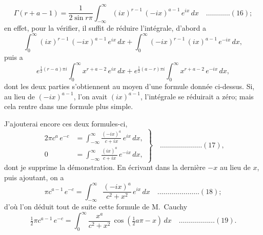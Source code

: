 \documentclass[11pt,a4paper]{book}
\begin{document}
\[
\Gamma(r + a - 1) = \frac{1}{2\sin r\pi} \int_{-\infty}^{\infty} (ix)^{r-1}\, (-ix)^{a-1}\, e^{ix}\, dx \quad \ldots \ldots \ldots \ldots (16);
\]
en effet, pour la v\'erifier, il suffit de r\'eduire l'int\'egrale, d'abord a
\[
\int_0^{\infty} (ix)^{r-1}\, (-ix)^{a-1}\, e^{ix}\, dx + \int_0^{\infty} (-ix)^{r-1}\, (ix)^{a-1}\, e^{-ix}\, dx,
\]
puis a
\[
e^{\frac{1}{2}(r-a)\pi i} \int_0^{\infty} x^{r+a-2}\, e^{ix}\, dx + e^{\frac{1}{2}(a-r)\pi i} \int_0^{\infty} x^{r+a-2}\, e^{-ix}\, dx,
\]
dont les deux parties s'obtiennent au moyen d'une formule donn\'ee ci-dessus. Si, au lieu de $(-ix)^{a-1}$, l'on avait $(ix)^{a-1}$, l'int\'egrale se r\'eduirait a z\'ero; mais cela rentre dans une formule plus simple.

J'ajouterai encore ces deux formules-ci,
\[
\left. \begin{aligned}
2\pi c^a \, e^{-c} &= \int_{-\infty}^{\infty} \frac{(-ix)^a}{c + ix} \, e^{ix}\, dx, \\ 
0 &= \int_{-\infty}^{\infty} \frac{(ix)^a}{c + ix} \, e^{-ix}\, dx,
\end{aligned} \right\} \quad \ldots \ldots \ldots \ldots \ldots \ldots \ldots (17),
\]
dont je supprime la d\'emonstration. En \'ecrivant dans la derni\`ere $-x$ au lieu de $x$, puis ajoutant, on a
\[
\pi c^{a-1} \, e^{-c} = \int_{-\infty}^{\infty} \frac{(-ix)^a}{c^2 + x^2} \, e^{ix}\, dx \quad \ldots \ldots \ldots \ldots \ldots \ldots \ldots (18);
\]
d'o\`u l'on d\'eduit tout de suite cette formule de M.~Cauchy
\[
\tfrac{1}{2}\pi c^{a-1} \, e^{-c} = \int_0^{\infty} \frac{x^a}{c^2 + x^2} \, \cos(\tfrac{1}{2}a\pi - x)\, dx \quad \ldots \ldots \ldots \ldots \ldots \ldots (19).
\]
\end{document}

